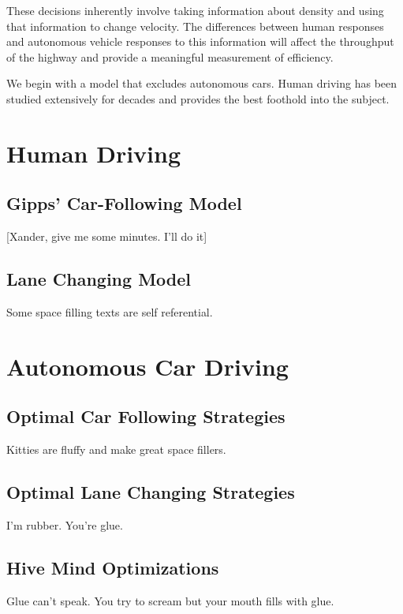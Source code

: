 These decisions inherently involve taking information about density and using that information to change velocity. The differences between human responses and autonomous vehicle responses to this information will affect the throughput of the highway and provide a meaningful measurement of efficiency.

We begin with a model that excludes autonomous cars. Human driving has been studied extensively for decades and provides the best foothold into the subject. 

\chapter{Human Driving}
\thispagestyle{fancy} %
\section{Gipps’ Car-Following Model}
[Xander, give me some minutes. I’ll do it]

\section{Lane Changing Model}

Some space filling texts are self referential.

\chapter{Autonomous Car Driving}
\thispagestyle{fancy} %
\section{Optimal Car Following Strategies}

Kitties are fluffy and make great space fillers.

\section{Optimal Lane Changing Strategies}
I’m rubber. You’re glue.

\section{Hive Mind Optimizations}
Glue can’t speak. You try to scream but your mouth fills with glue.

